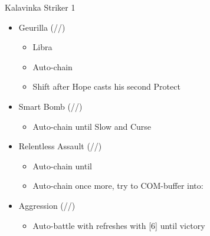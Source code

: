 \documentclass{report}
\begin{document}
\renewcommand{\first}{[1] Geurilla (\rav/\syn/\sab)}
\renewcommand{\second}{[2] Smart Bomb (\rav/\rav/\sab)}
\renewcommand{\third}{[3] Mystic Tower}
\renewcommand{\fourth}{[4] Relentless Assault (\rav/\rav/\com)}
\renewcommand{\fifth}{[5] Aggression (\com/\rav/\com)}

\begin{battle}{Kalavinka Striker 1}
\begin{itemize}
    \item \first
    \begin{itemize}
        \item Libra
        \item Auto-chain
        \item Shift after Hope casts his second Protect
    \end{itemize}
    \item \second
    \begin{itemize}
        \item Auto-chain until Slow and Curse
    \end{itemize}
    \item \fourth
    \begin{itemize}
        \item Auto-chain until \stagger
        \item Auto-chain once more, try to COM-buffer into:
    \end{itemize}
    \item \fifth
    \begin{itemize}
        \item Auto-battle with refreshes with [6] until victory
    \end{itemize}
\end{itemize}
\end{battle}
\end{document}
